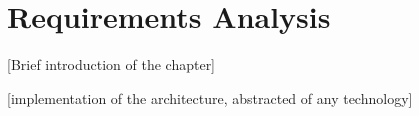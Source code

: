\chapter{Requirements Analysis}
 [Brief introduction of the chapter]

 [implementation of the architecture, abstracted of any technology]





